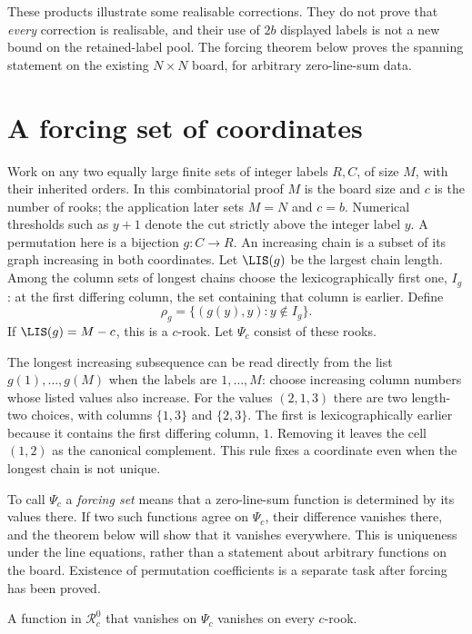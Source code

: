 These products illustrate some realisable corrections. They do not
prove that \emph{every} correction is realisable, and their use of
$2b$ displayed labels is not a new bound on the retained-label pool.
The forcing theorem below proves the spanning statement on the
existing $N\times N$ board, for arbitrary zero-line-sum data.

\section{A forcing set of coordinates}\label{tx:sec:forcing}
Work on any two equally large finite sets of integer labels $R,C$,
of size $M$, with their inherited orders. In this combinatorial proof
$M$ is the board size and $c$ is the number of rooks; the application
later sets $M=N$ and $c=b$. Numerical thresholds such as
$y+1$ denote the cut strictly above the integer label $y$. A permutation here is a bijection $g:C\to R$. An increasing chain is a subset of its graph increasing in both coordinates. Let $\LIS(g)$ be the largest chain length. Among the column sets of longest chains choose the lexicographically first one, $I_g$: at the first differing column, the set containing that column is earlier. Define
\[\rho_g=\{(g(y),y):y\notin I_g\}.
\]
If $\LIS(g)=M-c$, this is a $c$-rook. Let $\Psi_c$ consist of these rooks.

The longest increasing subsequence can be read directly from the
list $g(1),\ldots,g(M)$ when the labels are $1,\ldots,M$: choose
increasing column numbers whose listed values also increase.
For the values $(2,1,3)$ there are two length-two choices,
with columns $\{1,3\}$ and $\{2,3\}$. The first is lexicographically
earlier because it contains the first differing column, $1$.
Removing it leaves the cell $(1,2)$ as the canonical complement.
This rule fixes a coordinate even when the longest chain is not unique.

To call $\Psi_c$ a \emph{forcing set} means that a zero-line-sum
function is determined by its values there. If two such functions
agree on $\Psi_c$, their difference vanishes there, and the theorem
below will show that it vanishes everywhere. This is uniqueness under
the line equations, rather than a statement about arbitrary functions
on the board. Existence of permutation coefficients is a separate
task after forcing has been proved.

\begin{theorem}[Forcing]\label{tx:thm:force}
A function in $\mathcal R_c^{0}$ that vanishes on $\Psi_c$ vanishes on every $c$-rook.
\end{theorem}


